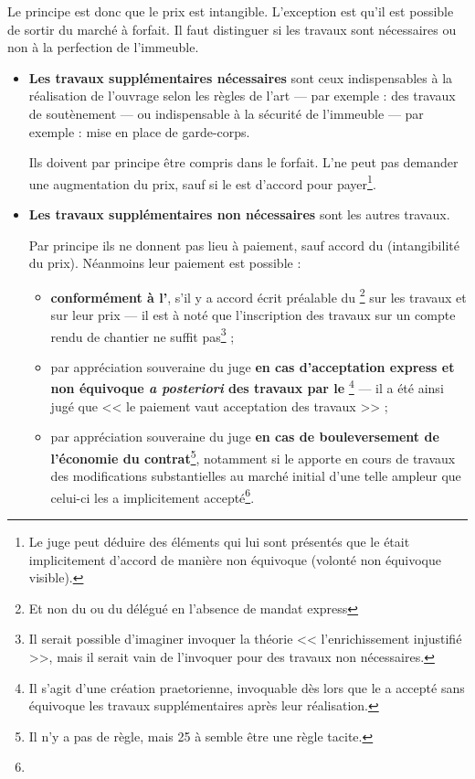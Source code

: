 					\bigskip Le principe est donc que le prix est intangible. L'exception est qu'il est possible de sortir du marché à forfait. Il faut distinguer si les travaux sont nécessaires ou non à la perfection de l'immeuble.
					\begin{itemize}
						\item \textbf{Les travaux supplémentaires nécessaires} sont ceux indispensables à la réalisation de l'ouvrage selon les règles de l'art --- par exemple : des travaux de soutènement --- ou indispensable à la sécurité de l'immeuble --- par exemple : mise en place de garde-corps.

						Ils doivent par principe être compris dans le forfait. L'\E ne peut pas demander une augmentation du prix, sauf si le \Mo est d'accord pour payer\footnote{Le juge peut déduire des éléments qui lui sont présentés que le \Mo était implicitement d'accord de manière non équivoque (volonté non équivoque visible).}.

						\item \textbf{Les travaux supplémentaires non nécessaires} sont les autres travaux.

						Par principe ils ne donnent pas lieu à paiement, sauf accord du \Mo (intangibilité du prix). Néanmoins leur paiement est possible :
						\begin{itemize}
							\item \textbf{conformément à l'}, s'il y a accord écrit préalable du \Mo\footnote{Et non du \Moe ou du \Mo délégué en l'absence de mandat express} sur les travaux et sur leur prix --- il est à noté que l'inscription des travaux sur un compte rendu de chantier ne suffit pas\footnote{Il serait possible d'imaginer invoquer la théorie << l'enrichissement injustifié >>, mais il serait vain de l'invoquer pour des travaux non nécessaires.} ;

							\item par appréciation souveraine du juge \textbf{en cas d'acceptation express et non équivoque \emph{a posteriori} des travaux par le \Mo}\footnote{Il s'agit d'une création praetorienne, invoquable dès lors que le \Mo a accepté sans équivoque les travaux supplémentaires après leur réalisation.} --- il a été ainsi jugé que << le paiement \lips vaut acceptation des travaux >> ;

							\item par appréciation souveraine du juge \textbf{en cas de bouleversement de l'économie du contrat}\footnote{Il n'y a pas de règle, mais 25 à  semble être une règle tacite.}, notamment si le \Mo apporte en cours de travaux des modifications substantielles au marché initial d'une telle ampleur que celui-ci les a implicitement accepté\footnote{}.
						\end{itemize}
					\end{itemize}

